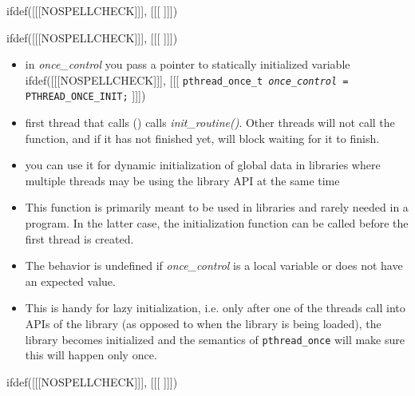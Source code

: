 
ifdef([[[NOSPELLCHECK]]], [[[
]]])

\begin{slide}
ifdef([[[NOSPELLCHECK]]], [[[
]]])
\begin{itemize}
\item in \emph{once\_control} you pass a pointer to statically initialized
variable
ifdef([[[NOSPELLCHECK]]], [[[
\texttt{pthread\_once\_t \emph{once\_control} = PTHREAD\_ONCE\_INIT;}
]]])
\item first thread that calls () calls
\emph{init\_routine()}.  Other threads will not call the function, and if it has
not finished yet, will block waiting for it to finish.
\item you can use it for dynamic initialization of global data in libraries
where multiple threads may be using the library API at the same time
\end{itemize}
\end{slide}

\begin{itemize}
\item This function is primarily meant to be used in libraries and rarely
needed in a program. In the latter case, the initialization function can be
called before the first thread is created.
\item The behavior is undefined if \emph{once\_control} is a local variable or
does not have an expected value.
\item This is handy for lazy initialization, i.e. only after one of the threads
call into APIs of the library (as opposed to when the library is being loaded),
the library becomes initialized and the semantics of \texttt{pthread\_once}
will make sure this will happen only once.
\end{itemize}


ifdef([[[NOSPELLCHECK]]], [[[
]]])

